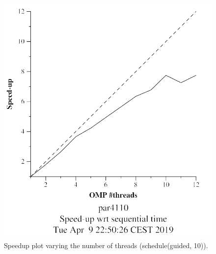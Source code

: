 \documentclass[12pt, a4paper]{article}
\begin{document}
\begin{figure}[H]
\begin{minipage}[b]{0.4\linewidth}
  \includegraphics[scale=0.5]{./mandel-omp-10000-strong-omp-for-guided-800-speedup}
  \caption{Speedup plot varying the number of threads (schedule(guided, 10)).}
  \label{fig:mandel-omp-10000-strong-omp-for-guided-800-speedup}
\end{minipage}
\end{figure}
\end{document}
